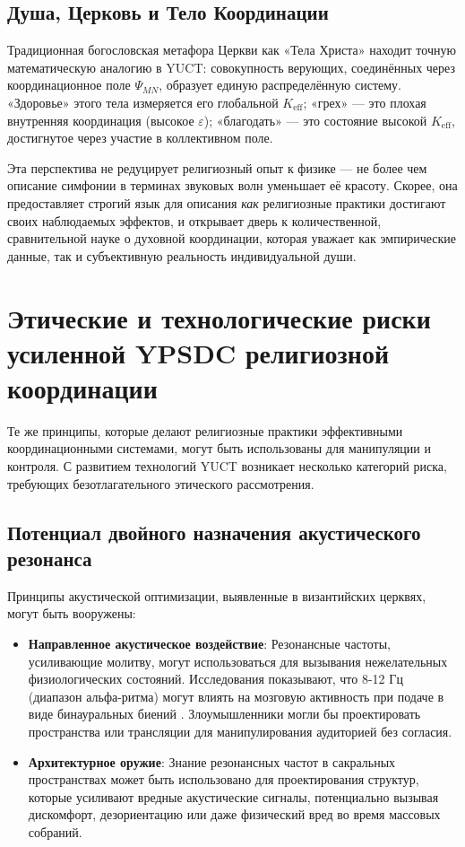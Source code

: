 \documentclass[12pt,a4paper]{article}
\begin{document}
	\subsection{Душа, Церковь и Тело Координации}
	
	Традиционная богословская метафора Церкви как «Тела Христа» находит точную математическую аналогию в YUCT: совокупность верующих, соединённых через координационное поле \(\Psi_{MN}\), образует единую распределённую систему. «Здоровье» этого тела измеряется его глобальной \(K_{\mathrm{eff}}\); «грех» — это плохая внутренняя координация (высокое \(\varepsilon\)); «благодать» — это состояние высокой \(K_{\mathrm{eff}}\), достигнутое через участие в коллективном поле.
	
	Эта перспектива не редуцирует религиозный опыт к физике — не более чем описание симфонии в терминах звуковых волн уменьшает её красоту. Скорее, она предоставляет строгий язык для описания \emph{как} религиозные практики достигают своих наблюдаемых эффектов, и открывает дверь к количественной, сравнительной науке о духовной координации, которая уважает как эмпирические данные, так и субъективную реальность индивидуальной души.
	
	\section{Этические и технологические риски усиленной YPSDC религиозной координации}
	\label{sec:risks}
	
	Те же принципы, которые делают религиозные практики эффективными координационными системами, могут быть использованы для манипуляции и контроля. С развитием технологий YUCT возникает несколько категорий риска, требующих безотлагательного этического рассмотрения.
	
	\subsection{Потенциал двойного назначения акустического резонанса}
	
	Принципы акустической оптимизации, выявленные в византийских церквях, могут быть вооружены:
	
	\begin{itemize}
		\item \textbf{Направленное акустическое воздействие}: Резонансные частоты, усиливающие молитву, могут использоваться для вызывания нежелательных физиологических состояний. Исследования показывают, что 8-12 Гц (диапазон альфа-ритма) могут влиять на мозговую активность при подаче в виде бинауральных биений \cite{Garcia2021}. Злоумышленники могли бы проектировать пространства или трансляции для манипулирования аудиторией без согласия.
		
		\item \textbf{Архитектурное оружие}: Знание резонансных частот в сакральных пространствах может быть использовано для проектирования структур, которые усиливают вредные акустические сигналы, потенциально вызывая дискомфорт, дезориентацию или даже физический вред во время массовых собраний.
	\end{itemize}
	
\end{document}
